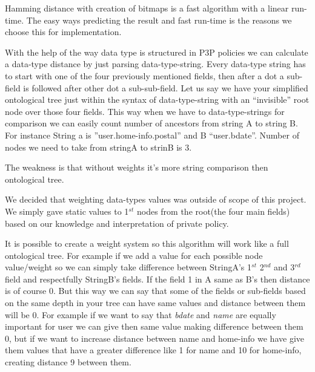 \documentclass{article}
\begin{document}
\noindent 

\noindent Hamming distance with creation of bitmaps is a fast algorithm with a linear run-time. The easy ways predicting the result and fast run-time is the reasons we choose this for implementation.

\noindent 

\noindent With the help of the way data type is structured in P3P policies we can calculate a data-type distance by just parsing data-type-string. Every data-type string has to start with one of the four previously mentioned fields, then after a dot a sub-field is followed after other dot a sub-sub-field. Let us say we have your simplified ontological tree just within the syntax of data-type-string with an ``invisible'' root node over those four fields. This way when we have to data-type-strings for comparison we can easily count number of ancestors from string A to string B. For instance String a is ''user.home-info.postal'' and B ``user.bdate''. Number of nodes we need to take from stringA to strinB is 3. 

\noindent 

\noindent The weakness is that without weights it's more string comparison then ontological tree.

\noindent 

\noindent We decided that weighting data-types values was outside of scope of this project. We simply gave static values to 1${}^{st}$ nodes from the root(the four main fields) based on our knowledge and interpretation of private policy.

\noindent 

\noindent It is possible to create a weight system so this algorithm will work like a full ontological tree. For example if we add a value for each possible node value/weight so we can simply take difference between StringA's 1${}^{st}$ 2${}^{nd}$ and 3${}^{rd}$ field and respectfully StringB's fields. If the field 1 in A same as B's then distance is of course 0. But this way we can say that some of the fields or sub-fields based on the same depth in your tree can have same values and distance between them will be 0. For example if we want to say that \textit{bdate} and \textit{name }are equally important for user we can give then same value making difference between them 0, but if we want to increase distance between name and home-info we have give them values that have a greater difference like 1 for name and 10 for home-info, creating distance 9 between them.

\noindent 
\end{document}

